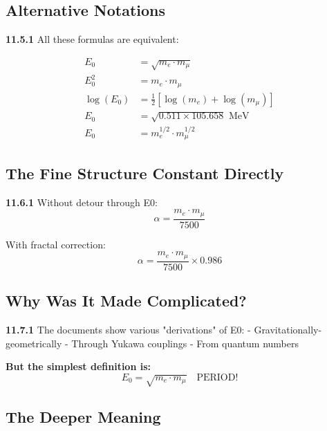 \documentclass[12pt,a4paper]{article}
\begin{document}
\subsection{Alternative Notations}

\noindent \textbf{11.5.1} All these formulas are equivalent:

\begin{align}
	E_0 &= \sqrt{m_e \cdot m_\mu} \\
	E_0^2 &= m_e \cdot m_\mu \\
	\log(E_0) &= \frac{1}{2}[\log(m_e) + \log(m_\mu)] \\
	E_0 &= \sqrt{0.511 \times 105.658} \text{ MeV} \\
	E_0 &= m_e^{1/2} \cdot m_\mu^{1/2}
\end{align}

\subsection{The Fine Structure Constant Directly}

\begin{tcolorbox}[colback=green!5!white,colframe=green!75!black,title=\textbf{The Most Direct Formula}]
	\noindent \textbf{11.6.1} Without detour through E0:
	\begin{equation}
		\boxed{\alpha = \frac{m_e \cdot m_\mu}{7500}}
	\end{equation}
	
	With fractal correction:
	\begin{equation}
		\boxed{\alpha = \frac{m_e \cdot m_\mu}{7500} \times 0.986}
	\end{equation}
\end{tcolorbox}

\subsection{Why Was It Made Complicated?}

\noindent \textbf{11.7.1} The documents show various "derivations" of E0:
- Gravitationally-geometrically
- Through Yukawa couplings
- From quantum numbers

\textbf{But the simplest definition is:}
\begin{equation}
	\boxed{E_0 = \sqrt{m_e \cdot m_\mu} \quad \text{PERIOD!}}
\end{equation}

\subsection{The Deeper Meaning}
\end{document}

